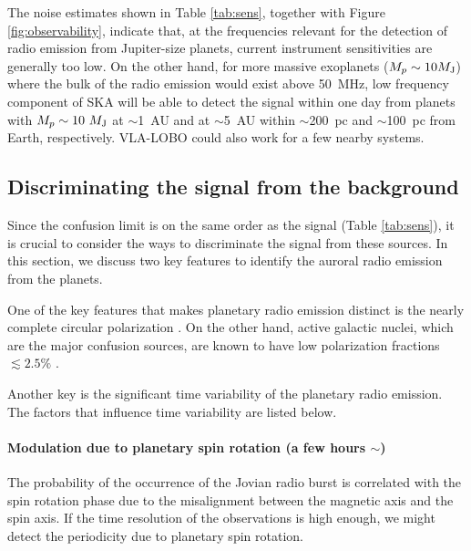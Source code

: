 \documentclass[iop,numberedappendix,apj]{emulateapj}
\begin{document}
The noise estimates shown in Table \ref{tab:sens}, together with Figure \ref{fig:observability}, indicate that, at the frequencies relevant for the detection of radio emission from Jupiter-size planets, current instrument sensitivities are generally too low.
On the other hand, for more massive exoplanets ($M_p\sim 10 M_{\rm J}$) where the bulk of the radio emission would exist above 50~MHz, low frequency component of SKA will be able to detect the signal within one day from planets with $M_p \sim 10~M_{\rm J}$ at $\sim$1~AU and at $\sim$5~AU within $\sim $200~pc and $\sim $100~pc from Earth, respectively.  
VLA-LOBO could also work for a few nearby systems. 




\subsection{Discriminating the signal from the background}
\label{ss:timevariability}


Since the confusion limit is on the same order as the signal (Table \ref{tab:sens}), it is crucial to consider the ways to discriminate the signal from these sources. 
In this section, we discuss two key features to identify the auroral radio emission from the planets. 

One of the key features that makes planetary radio emission distinct is the nearly  complete circular polarization \citep[e.g.][and reference therein]{dessler1983}. 
On the other hand, active galactic nuclei, which are the major confusion sources, are known to have low polarization fractions $\lesssim2.5\%$ \citep{Stil2014}. 

Another key is the significant time variability of the planetary radio emission. 
The factors that influence time variability are listed below. 

\paragraph{Modulation due to planetary spin rotation (a few hours $\sim $)}
The probability of the occurrence of the Jovian radio burst is correlated with the spin rotation phase \citep[e.g.][]{dessler1983} due to the misalignment between the magnetic axis and the spin axis. If the time resolution of the observations is high enough, we might detect the periodicity due to planetary spin rotation. 
%
\end{document}
